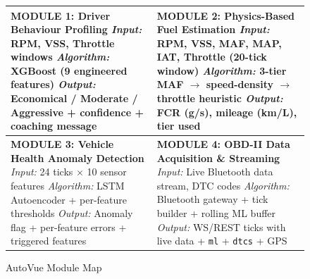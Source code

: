 \documentclass[10pt,a4paper]{report}
\begin{document}
\begin{figure}[H]
\centering
\renewcommand{\arraystretch}{1.4}
\begin{tabular}{|p{6.8cm}|p{6.8cm}|}
\hline
\textbf{MODULE 1: Driver Behaviour Profiling}\newline
\textit{Input:} RPM, VSS, Throttle windows\newline
\textit{Algorithm:} XGBoost (9 engineered features)\newline
\textit{Output:} Economical / Moderate / Aggressive\newline
+ confidence + coaching message
&
\textbf{MODULE 2: Physics-Based Fuel Estimation}\newline
\textit{Input:} RPM, VSS, MAF, MAP, IAT, Throttle\newline
(20-tick window)\newline
\textit{Algorithm:} 3-tier MAF $\rightarrow$ speed-density\newline
$\rightarrow$ throttle heuristic\newline
\textit{Output:} FCR (g/s), mileage (km/L), tier used
\\ \hline
\textbf{MODULE 3: Vehicle Health Anomaly Detection}\newline
\textit{Input:} 24 ticks $\times$ 10 sensor features\newline
\textit{Algorithm:} LSTM Autoencoder + per-feature\newline
thresholds\newline
\textit{Output:} Anomaly flag + per-feature errors\newline
+ triggered features
&
\textbf{MODULE 4: OBD-II Data Acquisition \& Streaming}\newline
\textit{Input:} Live Bluetooth data stream,\newline
DTC codes\newline
\textit{Algorithm:} Bluetooth gateway + tick builder\newline
+ rolling ML buffer\newline
\textit{Output:} WS/REST ticks with live data\newline
+ \texttt{ml} + \texttt{dtcs} + GPS
\\ \hline
\end{tabular}
\caption{AutoVue Module Map}
\label{fig:modules}
\end{figure}
\end{document}
